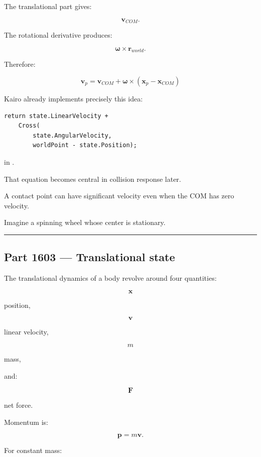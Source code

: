 The translational part gives:

\[
\mathbf{v}_{COM}.
\]

The rotational derivative produces:

\[
\boldsymbol{\omega}\times\mathbf{r}_{world}.
\]

Therefore:

\[
\boxed{
\mathbf{v}_p
=
\mathbf{v}_{COM}
+
\boldsymbol{\omega}
\times
(\mathbf{x}_p-\mathbf{x}_{COM})
}
\]

Kairo already implements precisely this idea:

\begin{verbatim}
return state.LinearVelocity +
    Cross(
        state.AngularVelocity,
        worldPoint - state.Position);
\end{verbatim}

in .

That equation becomes central in collision response later.

A contact point can have significant velocity even when the COM has zero velocity.

Imagine a spinning wheel whose center is stationary.

\begin{center}\rule{0.5\linewidth}{0.5pt}\end{center}

\subsection{Part 1603 --- Translational state}\label{06-engine-ii-ch034-part-1603-translational-state}

\hypertarget{06-engine-ii-ch034-part-1603-translational-state}{}

The translational dynamics of a body revolve around four quantities:

\[
\mathbf{x}
\]

position,

\[
\mathbf{v}
\]

linear velocity,

\[
m
\]

mass,

and:

\[
\mathbf{F}
\]

net force.

Momentum is:

\[
\mathbf{p}=m\mathbf{v}.
\]

For constant mass:

